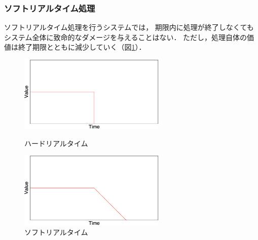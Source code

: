 \subsubsection{ソフトリアルタイム処理}

\vspace{0.5em}ソフトリアルタイム処理を行うシステムでは，
期限内に処理が終了しなくてもシステム全体に致命的なダメージを与えることはない．
ただし，処理自体の価値は終了期限とともに減少していく（図\ref{fig:softrealtime}）．


\begin{figure}[htbp]
 \begin{minipage}{0.5\hsize} \begin{center}
     \includegraphics[width=70mm]{./images/hardrealtime.eps}
    \end{center}
    \caption{ハードリアルタイム}
    \label{fig:hardrealtime}
 \end{minipage}
 \begin{minipage}{0.5\hsize}
    \begin{center}
     \includegraphics[width=70mm]{./images/softrealtime.eps}
    \end{center}
    \caption{ソフトリアルタイム}
    \label{fig:softrealtime}
 \end{minipage}
\end{figure}




